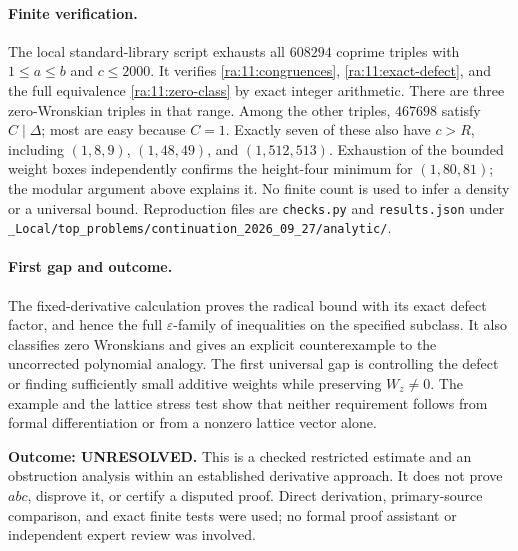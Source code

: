 \documentclass[11pt]{article}
\begin{document}
\paragraph{Finite verification.}
The local standard-library script exhausts all $608294$ coprime triples
with $1\le a\le b$ and $c\le2000$. It verifies
\eqref{ra:11:congruences}, \eqref{ra:11:exact-defect}, and the full
equivalence \eqref{ra:11:zero-class} by exact integer arithmetic.
There are three zero-Wronskian triples in that range. Among the other
triples, $467698$ satisfy $C\mid\Delta$; most are easy because $C=1$.
Exactly seven of these also have $c>R$, including $(1,8,9)$,
$(1,48,49)$, and $(1,512,513)$.
Exhaustion of the bounded weight boxes independently confirms the
height-four minimum for $(1,80,81)$; the modular argument above explains it.
No finite count is used to infer a density or a universal bound.
Reproduction files are \texttt{checks.py} and \texttt{results.json} under
\texttt{\_Local/top\_problems/continuation\_2026\_09\_27/analytic/}.

\paragraph{First gap and outcome.}
The fixed-derivative calculation proves the radical bound with its exact
defect factor, and hence the full $\varepsilon$-family of inequalities
on the specified subclass. It also classifies zero Wronskians and gives
an explicit counterexample to the uncorrected polynomial analogy.
The first universal gap is controlling the defect or finding sufficiently
small additive weights while preserving $W_z\ne0$. The example and the
lattice stress test show that neither requirement follows from formal
differentiation or from a nonzero lattice vector alone.

\textbf{Outcome: UNRESOLVED.} This is a checked restricted estimate and
an obstruction analysis within an established derivative approach. It
does not prove $abc$, disprove it, or certify a disputed proof. Direct
derivation, primary-source comparison, and exact finite tests were used;
no formal proof assistant or independent expert review was involved.
\end{document}
